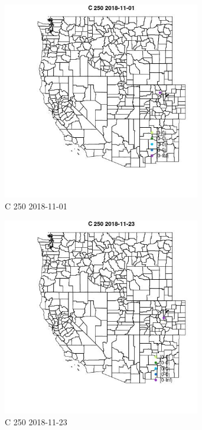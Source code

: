 \begin{figure} 
\centering  
\includegraphics[width=0.77\textwidth]{Code_Outputs/Report_ML_input_PM25_Step4_part_e_de_duplicated_aves_MapObsC_2502018-11-01.jpg} 
\caption{\label{fig:Report_ML_input_PM25_Step4_part_e_de_duplicated_avesMapObsC_2502018-11-01}C 250 2018-11-01} 
\end{figure} 
 

\begin{figure} 
\centering  
\includegraphics[width=0.77\textwidth]{Code_Outputs/Report_ML_input_PM25_Step4_part_e_de_duplicated_aves_MapObsC_2502018-11-23.jpg} 
\caption{\label{fig:Report_ML_input_PM25_Step4_part_e_de_duplicated_avesMapObsC_2502018-11-23}C 250 2018-11-23} 
\end{figure} 
 

